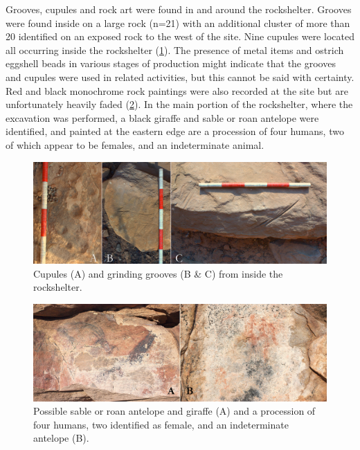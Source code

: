 \documentclass{ijsra}
\begin{document}
Grooves, cupules and  rock art were found in and around the rockshelter. Grooves were found inside on a large rock (n=21) with an additional cluster of more than 20 identified on an exposed rock to the west of the site. 
Nine cupules were located all occurring inside the rockshelter (\cref{fig:Forssman-Figure13}). 
The presence of metal items and ostrich eggshell beads in various stages of production might indicate that 
the grooves and cupules were used in related activities, but this cannot be said with certainty. 
Red and black monochrome rock paintings were also recorded at the site but are unfortunately heavily faded (\cref{fig:Forssman-Figure14}).
In the main portion of the rockshelter, where the excavation was performed, a black giraffe and sable or roan antelope were identified, and painted at the eastern edge are a procession of four humans, two of which appear to be females, and an indeterminate animal. 

	\begin{figure} %
		\includegraphics[width=\linewidth]{figures/Forssman-Figure13}
		\caption{Cupules (A) and grinding grooves (B \& C) from inside the rockshelter.}
		\label{fig:Forssman-Figure13}
	\end{figure}
	
	\begin{figure} %
		\includegraphics[width=\linewidth]{figures/Forssman-Figure14}
		\caption{Possible sable or roan antelope and giraffe (A) and a procession of four humans, two identified as female, and an indeterminate antelope (B).}
		\label{fig:Forssman-Figure14}
	\end{figure}
\end{document}
